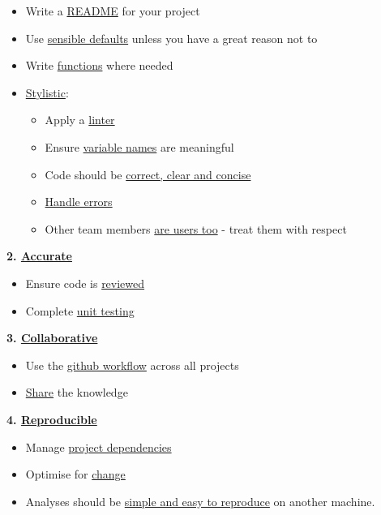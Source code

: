 \documentclass[]{book}
\providecommand{\tightlist}{%
  \setlength{\itemsep}{0pt}\setlength{\parskip}{0pt}}
\begin{document}
\begin{itemize}
\tightlist
\item
  Write a \protect\hyperlink{readme}{README} for your project\\
\item
  Use \protect\hyperlink{defaults}{sensible defaults} unless you have a great reason not to
\item
  Write \protect\hyperlink{functions}{functions} where needed\\
\item
  \protect\hyperlink{style}{Stylistic}:

  \begin{itemize}
  \tightlist
  \item
    Apply a \protect\hyperlink{linter}{linter}
  \item
    Ensure \protect\hyperlink{names}{variable names} are meaningful
  \item
    Code should be \protect\hyperlink{ccc}{correct, clear and concise}
  \item
    \protect\hyperlink{errors}{Handle errors}\\
  \item
    Other team members \protect\hyperlink{users}{are users too} - treat them with respect
  \end{itemize}
\end{itemize}

\textbf{2. \protect\hyperlink{accurate}{Accurate}}

\begin{itemize}
\tightlist
\item
  Ensure code is \protect\hyperlink{review}{reviewed}
\item
  Complete \protect\hyperlink{unittest}{unit testing}
\end{itemize}

\textbf{3. \protect\hyperlink{collaborate}{Collaborative}}

\begin{itemize}
\tightlist
\item
  Use the \protect\hyperlink{versioncontrol}{github workflow} across all projects\\
\item
  \protect\hyperlink{knowledge}{Share} the knowledge
\end{itemize}

\textbf{4. \protect\hyperlink{reproduce}{Reproducible}}

\begin{itemize}
\tightlist
\item
  Manage \protect\hyperlink{projdep}{project dependencies}
\item
  Optimise for \protect\hyperlink{change}{change}\\
\item
  Analyses should be \protect\hyperlink{githash}{simple and easy to reproduce} on another machine.
\end{itemize}
\end{document}

